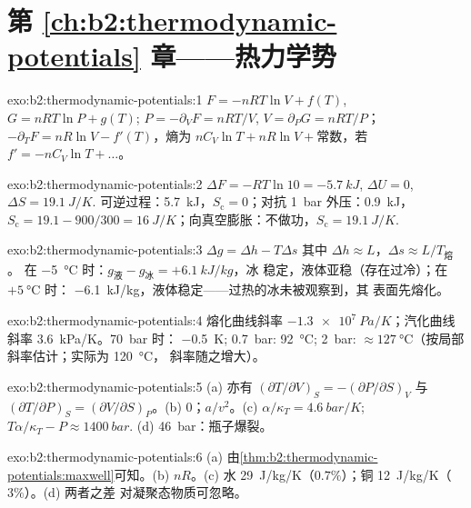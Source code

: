 \section*{第 \ref{ch:b2:thermodynamic-potentials} 章——热力学势}

\begin{solution}{exo:b2:thermodynamic-potentials:1}
$F = -nRT\ln V + f(T)$, $G = nRT\ln P + g(T)$; $P = -\partial_VF = nRT/V$,
$V = \partial_PG = nRT/P$；$-\partial_TF = nR\ln V - f'(T)$，熵为
$nC_V\ln T + nR\ln V + \text{常数}$，若 $f' = -nC_V\ln T + \dots$。
\end{solution}

\begin{solution}{exo:b2:thermodynamic-potentials:2}
$\Delta F = -RT\ln 10 = \qty{-5.7}{kJ}$, $\Delta U = 0$, $\Delta S = \qty{19.1}{J/K}$.
可逆过程：\qty{5.7}{kJ}，$S_{\text{c}} = 0$；对抗 \qty{1}{bar} 外压：\qty{0.9}{kJ}，
$S_{\text{c}} = 19.1 - 900/300 = \qty{16}{J/K}$；向真空膨胀：不做功，$S_{\text{c}} =
\qty{19.1}{J/K}$.
\end{solution}

\begin{solution}{exo:b2:thermodynamic-potentials:3}
$\Delta g = \Delta h - T\Delta s$ 其中 $\Delta h \approx L$，$\Delta s \approx L/T_{\text{熔}}$。
在 \qty{-5}{\celsius} 时：$g_{\text{液}} - g_{\text{冰}} = +\qty{6.1}{kJ/kg}$，冰
稳定，液体亚稳（存在过冷）；在 $+\qty{5}{\celsius}$ 时：
\qty{-6.1}{kJ/kg}，液体稳定——过热的冰未被观察到，其
表面先熔化。
\end{solution}

\begin{solution}{exo:b2:thermodynamic-potentials:4}
熔化曲线斜率 $\qty{-1.3e7}{Pa/K}$；汽化曲线斜率 \qty{3.6}{kPa/K}。\qty{70}{bar} 时：
\qty{-0.5}{K}; \qty{0.7}{bar}: \qty{92}{\celsius}; \qty{2}{bar}: $\approx
\qty{127}{\celsius}$（按局部斜率估计；实际为 \qty{120}{\celsius}，
斜率随之增大）。
\end{solution}

\begin{solution}{exo:b2:thermodynamic-potentials:5}
(a) 亦有 $(\partial T/\partial V)_S = -(\partial P/\partial S)_V$ 与
$(\partial T/\partial P)_S = (\partial V/\partial S)_P$。(b) $0$；$a/v^2$。(c)
$\alpha/\kappa_T = \qty{4.6}{bar/K}$; $T\alpha/\kappa_T - P \approx \qty{1400}{bar}$.
(d) \qty{46}{bar}：瓶子爆裂。
\end{solution}

\begin{solution}{exo:b2:thermodynamic-potentials:6}
(a) 由\cref{thm:b2:thermodynamic-potentials:maxwell}可知。(b) $nR$。(c) 水
\qty{29}{J/kg/K}（$0.7\%$）；铜 \qty{12}{J/kg/K}（$3\%$）。(d) 两者之差
对凝聚态物质可忽略。
\end{solution}


